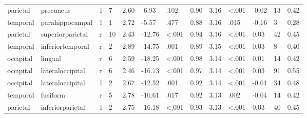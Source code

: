 \documentclass{article}
\begin{document}
\begin{longtable}{llrR{1.3cm}R{1cm}R{1.3cm}R{1cm}R{1cm}R{1.3cm}R{1cm}R{1.8cm}R{1.3cm}R{1.8cm}}
  parietal &                 precuneus &    l &         7 &                  2.60 &            -6.93 &               .102 &                               0.90 &                          3.16 &                   \textless.001 &  -0.02 &     13 &      0.42 \\
  temporal &           parahippocampal &    l &         1 &                  2.72 &            -5.57 &               .477 &                               0.88 &                          3.16 &                            .015 &  -0.16 &      3 &      0.28 \\
  parietal &          superiorparietal &    r &        10 &                  2.43 &           -12.76 &      \textless.001 &                               0.94 &                          3.16 &                   \textless.001 &   0.03 &     42 &      0.45 \\
  temporal &          inferiortemporal &    r &         2 &                  2.89 &           -14.75 &               .001 &                               0.89 &                          3.15 &                   \textless.001 &   0.03 &      8 &      0.40 \\
 occipital &                   lingual &    r &         6 &                  2.59 &           -18.25 &      \textless.001 &                               0.98 &                          3.14 &                   \textless.001 &   0.01 &     14 &      0.42 \\
 occipital &          lateraloccipital &    r &         6 &                  2.46 &           -16.73 &      \textless.001 &                               0.97 &                          3.14 &                   \textless.001 &   0.03 &     91 &      0.55 \\
 occipital &          lateraloccipital &    l &         2 &                  2.67 &           -12.52 &               .001 &                               0.92 &                          3.14 &                   \textless.001 &  -0.01 &     34 &      0.48 \\
  temporal &                  fusiform &    r &         5 &                  2.78 &           -10.61 &               .017 &                               0.92 &                          3.13 &                            .002 &  -0.04 &     14 &      0.42 \\
  parietal &          inferiorparietal &    l &         2 &                  2.75 &           -16.18 &      \textless.001 &                               0.93 &                          3.13 &                   \textless.001 &   0.03 &     40 &      0.45 \\

\end{longtable}
\end{document}
